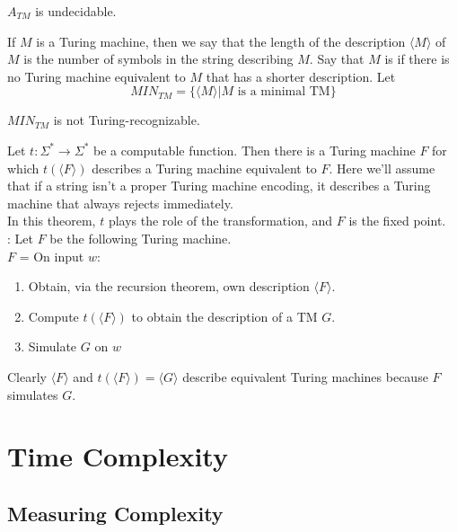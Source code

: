 \documentclass{article}
\begin{document}
 \begin{theorem}
   $A_{TM}$ is undecidable. 
 \end{theorem}

\begin{definition}
  If $M$ is a Turing machine, then we say that the length of the description $\langle M \rangle$ of $M$ is the number of symbols in the string describing $M$. Say that $M$ is  if there is no Turing machine equivalent to $M$ that has a shorter description. Let $$MIN_{TM} = \{\langle M \rangle \vert M \textrm{ is a minimal TM}\}$$
\end{definition}

\begin{theorem}
  $MIN_{TM}$ is not Turing-recognizable. 
\end{theorem}

\begin{theorem}
  Let $t: \Sigma^{*} \rightarrow \Sigma^{*}$ be a computable function. Then there is a Turing machine $F$ for which $t(\langle F \rangle)$ describes a Turing machine equivalent to $F$. Here we'll assume that if a string isn't a proper Turing machine encoding, it describes a Turing machine that always rejects immediately. \\ 
  In this theorem, $t$ plays the role of the transformation, and $F$ is the fixed point.\\ 

  : Let $F$ be the following Turing machine. \\ 
  $F$ = On input $w$: 
  \begin{enumerate}
    \item Obtain, via the recursion theorem, own description $\langle F \rangle$. 
    \item Compute $t(\langle F \rangle)$ to obtain the description of a TM $G$. 
    \item Simulate $G$ on $w$
  \end{enumerate}
  Clearly $\langle F \rangle$ and $t(\langle F \rangle) = \langle G \rangle$ describe equivalent Turing machines because $F$ simulates $G$. 
\end{theorem}

\section{Time Complexity}

\subsection{Measuring Complexity}
\end{document}
